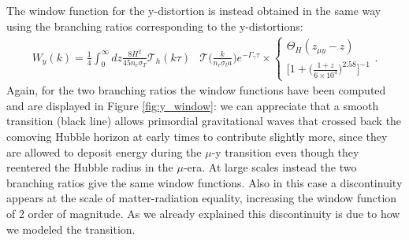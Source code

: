 The window function for the y-distortion is instead obtained in the same way using the branching ratios corresponding to the y-distortions:
\begin{align*}
    W_y(k)=\frac14\int_{0}^\infty dz\frac{8H^2}{45 n_e\sigma_T}\mathcal T_h(k\tau)&\mathcal T\Big(\tfrac{k}{n_e\sigma_ta}\Big)e^{-\Gamma_\gamma\tau}\times
    \begin{cases}
        \Theta_H(z_{\mu y}-z)\\
        \bigg[1+\big(\frac{1+z}{6\times10^{4}}\big)^{2.58}\bigg]^{-1}
    \end{cases}.
\end{align*}
Again, for the two branching ratios the window functions have been computed and are displayed in Figure \ref{fig:y_window}: we can appreciate that a smooth transition (black line) allows primordial gravitational waves that crossed back the comoving Hubble horizon at early times to contribute slightly more, since they are allowed to deposit energy during the $\mu$-y transition even though they reentered the Hubble radius in the $\mu$-era. At large scales instead the two branching ratios give the same window functions. Also in this case a discontinuity appears at the scale of matter-radiation equality, increasing the window function of 2 order of magnitude. As we already explained this discontinuity is due to how we modeled the transition.

